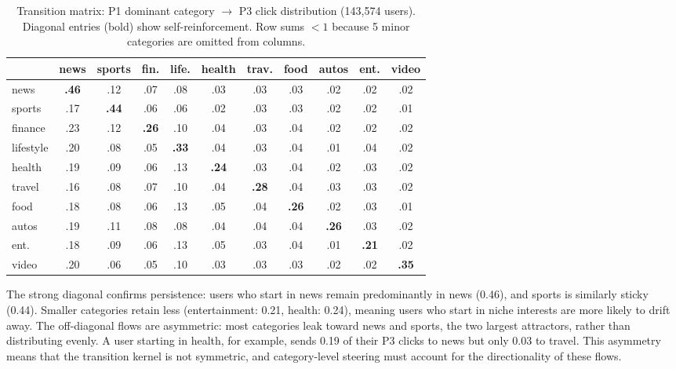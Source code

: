 \documentclass[11pt]{article}
\begin{document}
\begin{table}[ht]
\centering
\caption{Transition matrix: P1 dominant category $\to$ P3 click distribution (143,574 users). Diagonal entries (bold) show self-reinforcement. Row sums $< 1$ because 5 minor categories are omitted from columns.}
\label{tab:transition}
\small
\setlength{\tabcolsep}{3.5pt}
\begin{tabular}{l|cccccccccc}
\toprule
& news & sports & fin. & life. & health & trav. & food & autos & ent. & video \\
\midrule
news & \textbf{.46} & .12 & .07 & .08 & .03 & .03 & .03 & .02 & .02 & .02 \\
sports & .17 & \textbf{.44} & .06 & .06 & .02 & .03 & .03 & .02 & .02 & .01 \\
finance & .23 & .12 & \textbf{.26} & .10 & .04 & .03 & .04 & .02 & .02 & .02 \\
lifestyle & .20 & .08 & .05 & \textbf{.33} & .04 & .03 & .04 & .01 & .04 & .02 \\
health & .19 & .09 & .06 & .13 & \textbf{.24} & .03 & .04 & .02 & .03 & .02 \\
travel & .16 & .08 & .07 & .10 & .04 & \textbf{.28} & .04 & .03 & .03 & .02 \\
food & .18 & .08 & .06 & .13 & .05 & .04 & \textbf{.26} & .02 & .03 & .01 \\
autos & .19 & .11 & .08 & .08 & .04 & .04 & .04 & \textbf{.26} & .03 & .02 \\
ent. & .18 & .09 & .06 & .13 & .05 & .03 & .04 & .01 & \textbf{.21} & .02 \\
video & .20 & .06 & .05 & .10 & .03 & .03 & .03 & .02 & .02 & \textbf{.35} \\
\bottomrule
\end{tabular}
\end{table}
\FloatBarrier

The strong diagonal confirms persistence: users who start in news remain predominantly in news (0.46), and sports is similarly sticky (0.44). Smaller categories retain less (entertainment: 0.21, health: 0.24), meaning users who start in niche interests are more likely to drift away. The off-diagonal flows are asymmetric: most categories leak toward news and sports, the two largest attractors, rather than distributing evenly. A user starting in health, for example, sends 0.19 of their P3 clicks to news but only 0.03 to travel. This asymmetry means that the transition kernel is not symmetric, and category-level steering must account for the directionality of these flows.
\end{document}
